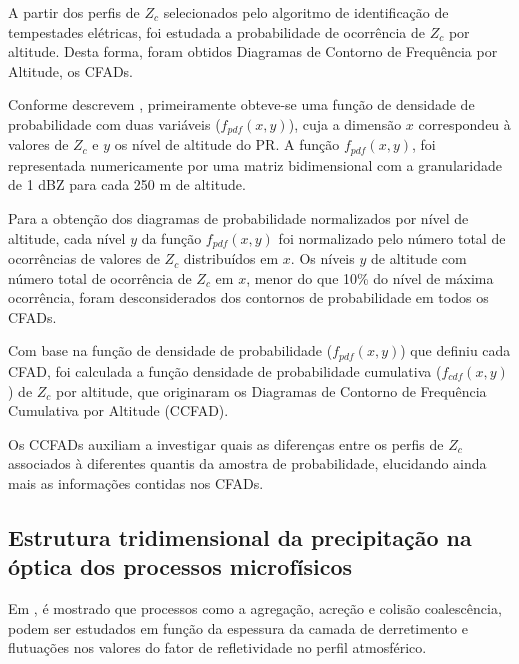 A partir dos perfis de $Z_c$ selecionados pelo algoritmo de identificação de tempestades elétricas, foi estudada a probabilidade de ocorrência de $Z_c$ por altitude. Desta forma, foram obtidos Diagramas de Contorno de Frequência por Altitude, os CFADs.

Conforme descrevem , primeiramente obteve-se uma função de densidade de probabilidade com duas variáveis ($f_{pdf}(x,y)$), cuja a dimensão $x$ correspondeu à valores de $Z_{c}$ e $y$ os nível de altitude do PR. A função $f_{pdf}(x,y)$, foi representada numericamente por uma matriz bidimensional com a granularidade de 1 dBZ para cada 250 m de altitude.



Para a obtenção dos diagramas de probabilidade normalizados por nível de altitude, cada nível $y$ da função $f_{pdf}(x,y)$ foi normalizado pelo número total de ocorrências de valores de $Z_c$ distribuídos em $x$. Os níveis $y$ de altitude com número total de ocorrência de $Z_c$ em $x$, menor do que 10\% do nível de máxima ocorrência, foram desconsiderados dos contornos de probabilidade em todos os CFADs.

Com base na função de densidade de probabilidade ($f_{pdf}(x,y)$) que definiu cada CFAD, foi calculada a função densidade de probabilidade cumulativa ($f_{cdf}(x,y)$) de $Z_c$ por altitude, que originaram os Diagramas de Contorno de Frequência Cumulativa por Altitude (CCFAD).     



Os CCFADs auxiliam a investigar quais as diferenças entre os perfis de $Z_c$ associados à diferentes quantis da amostra de probabilidade, elucidando ainda mais as informações contidas nos CFADs.


\subsection{Estrutura tridimensional da precipitação na óptica dos processos microfísicos}

\label{chuvaEtemperatura}


Em , é mostrado que processos como a agregação, acreção e colisão coalescência, podem ser estudados em função da espessura da camada de derretimento e flutuações nos valores do fator de refletividade no perfil atmosférico. 

